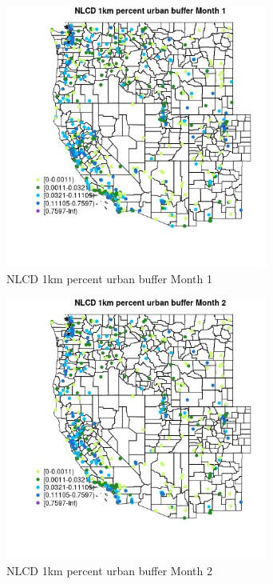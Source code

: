 \begin{figure} 
\centering  
\includegraphics[width=0.77\textwidth]{Code_Outputs/Report_ML_input_PM25_Step4_part_e_de_duplicated_aves_compiled_2019-05-18wNAs_MapObsMo1NLCD_1km_percent_urban_buffer.jpg} 
\caption{\label{fig:Report_ML_input_PM25_Step4_part_e_de_duplicated_aves_compiled_2019-05-18wNAsMapObsMo1NLCD_1km_percent_urban_buffer}NLCD 1km percent urban buffer Month 1} 
\end{figure} 
 

\begin{figure} 
\centering  
\includegraphics[width=0.77\textwidth]{Code_Outputs/Report_ML_input_PM25_Step4_part_e_de_duplicated_aves_compiled_2019-05-18wNAs_MapObsMo2NLCD_1km_percent_urban_buffer.jpg} 
\caption{\label{fig:Report_ML_input_PM25_Step4_part_e_de_duplicated_aves_compiled_2019-05-18wNAsMapObsMo2NLCD_1km_percent_urban_buffer}NLCD 1km percent urban buffer Month 2} 
\end{figure} 
 

